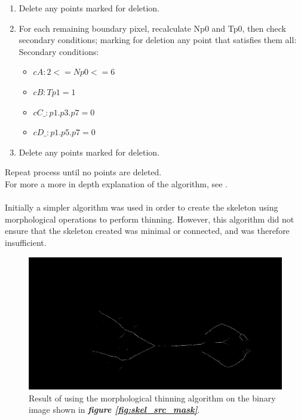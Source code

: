 \documentclass[a4paper, 12pt]{article}
\begin{document}
\begin{enumerate}
        \item Delete any points marked for deletion.
        \item For each remaining boundary pixel, recalculate Np0 and Tp0, then check secondary conditions; marking for deletion any point that satisfies them all:\\
Secondary conditions:
        \begin{itemize}
        \item $cA:     2 <= Np0 <= 6$
        \item $cB:     Tp1 = 1$
        \item $cC\_:    p1 . p3 . p7 = 0$
        \item $cD\_:    p1 . p5 . p7 = 0$
        \end{itemize}
        \item Delete any points marked for deletion.
        \end{enumerate}
%
Repeat process until no points are deleted.\\
For more a more in depth explanation of the algorithm, see \cite{skeletonisation}.\\
\\
Initially a simpler algorithm\cite{skeletonisation_simple} was used in order to create the skeleton using morphological operations to perform thinning. However, this algorithm did not ensure that the skeleton created was minimal or connected, and was therefore insufficient.
\begin{figure}[H]
	\centering
	\includegraphics[width=\linewidth]{skel_simple.jpg}
	\caption{Result of using the morphological thinning algorithm on the binary image shown in \textbf{\emph{figure \ref{fig:skel_src_mask}}}.}
	\label{fig:skel_simple}
\end{figure}
\end{document}
